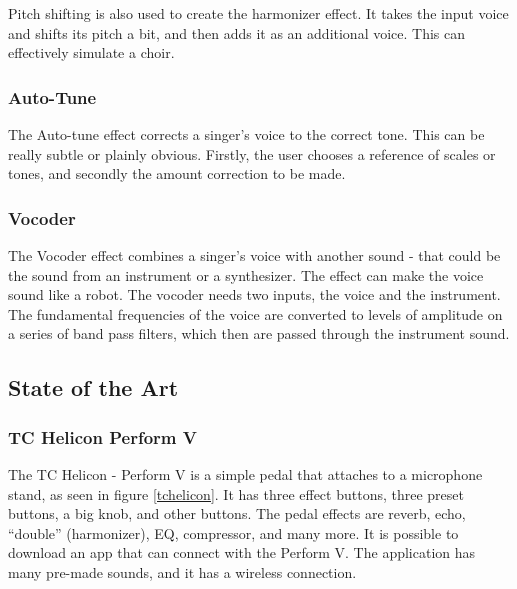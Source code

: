 Pitch shifting is also used to create the harmonizer effect. It takes the input voice and shifts its pitch a bit, and then adds it as an additional voice. This can effectively simulate a choir.

\subsubsection{Auto-Tune}

The Auto-tune effect corrects a singer's voice to the correct tone\citep{Hadhazy_2010}. This can be really subtle or plainly obvious. Firstly, the user chooses a reference of scales or tones, and secondly the amount correction to be made.

\subsubsection{Vocoder}

The Vocoder effect combines a singer's voice with another sound - that could be the sound from an instrument or a synthesizer\citep{Vocoder_00}. 
The effect can make the voice sound like a robot. The vocoder needs two inputs, the voice and the instrument. The fundamental frequencies of the voice are converted to levels of amplitude on a series of band pass filters, which then are passed through the instrument sound.


\subsection{State of the Art}

\subsubsection{TC Helicon Perform V}

The TC Helicon - Perform V is a simple pedal that attaches to a microphone stand, as seen in figure \ref{tchelicon}\citep{TC}. It has three effect buttons, three preset buttons, a big knob, and other buttons. The pedal effects are reverb, echo, “double” (harmonizer), EQ, compressor, and many more. It is possible to download an app that can connect with the Perform V. The application has many pre-made sounds, and it has a wireless connection. \\

\begin{minipage}{\linewidth}%
\label{tchelicon}
\end{minipage}\\


